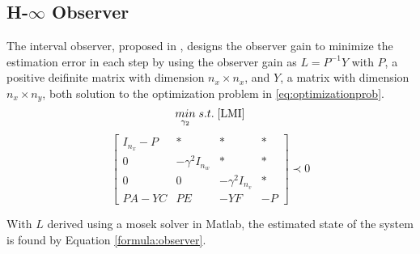 \subsection{H-$\infty$ Observer}
The interval observer, proposed in \cite{Tang2019}, designs the observer gain to minimize the estimation error in each step by using the observer gain as $L= P^{-1}Y$ with $P$, a positive deifinite matrix with dimension $n_x \times n_x$, and $Y$, a matrix with dimension $n_x \times n_y$, both solution to the optimization problem in \eqref{eq:optimizationprob}.
\begin{equation}
\label{eq:optimizationprob}
\underset{\gamma _2}{min} \;
s.t. \; \eqref{LMI}
\end{equation} 
\begin{equation}
\label{LMI}
\left[\begin{matrix}
I_{n_x} -P & * & * & *\\
0 & -\gamma ^2 I_{n_w} & * &* \\
0 & 0 & -\gamma ^2 I_{n_v} & *\\
PA-YC & PE & -YF & -P
\end{matrix}\right]  \prec 0
\end{equation} 

With $L$ derived using a mosek solver in Matlab, the estimated state of the system is found by Equation \eqref{formula:observer}.
